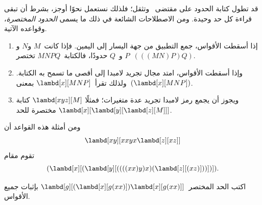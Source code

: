 \documentclass[../../../include/open-logic-section]{subfiles}
\begin{document}

قد تطول كتابة الحدود على مقتضى~ وتثقل؛
فلذلك نستعمل نحوًا أوجز، بشرط أن تبقى قراءة كل حد وحيدة.
ومن الاصطلاحات الشائعة في ذلك ما يسمى \emph{الحدود المختصرة}، وقواعده الآتية.

\begin{enumerate}
\item إذا أسقطت الأقواس، جمع التطبيق من جهة اليسار إلى اليمين.
  فإذا كانت~$M$ و$N$ و$P$ و~$Q$ حدودًا، فالكتابة~$MNPQ$ تختصر~$(((MN)P)Q)$.
\item وإذا أسقطت الأقواس، امتد مجال تجريد لامبدا إلى أقصى ما تسمح به الكتابة.
  ولذلك تقرأ~$\lambd[x][MNP]$ بمعنى~$(\lambd[x][MNP])$.
\item ويجوز أن يجمع رمز لامبدا تجريد عدة متغيرات؛ فمثلًا
  $\lambd[xyz][M]$ كتابة مختصرة للحد
  $\lambd[x][\lambd[y][\lambd[z][M]]]$.
\end{enumerate}

ومن أمثلة هذه القواعد أن
\[
\lambd[xy][xxyx \lambd[z][xz]]
\]
تقوم مقام
\[
(\lambd[x][(\lambd[y][((((xx)y)x)(\lambd[z][(xz)]))])]).
\]

\begin{prob}
اكتب الحد المختصر~$\lambd[g][(\lambd[x][g (x x)])
  \lambd[x][g (x x)]]$ بإثبات جميع الأقواس.
\end{prob}
\end{document}
